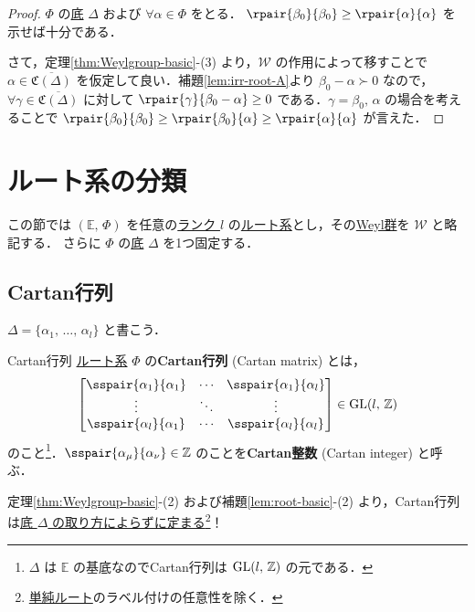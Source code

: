 \documentclass[rep_main]{subfiles}
\begin{document}
\begin{proof}
	$\Phi$ の\hyperref[def:base-root]{底} $\Delta$ および $\forall \alpha \in \Phi$ をとる．
	$\rpair{\beta_0}{\beta_0} \ge \rpair{\alpha}{\alpha}$ を示せば十分である．

	さて，定理\ref{thm:Weylgroup-basic}-(3) より，$\mathscr{W}$ の作用によって移すことで $\alpha \in \overline{\mathfrak{C}(\Delta)}$ を仮定して良い．補題\ref{lem:irr-root-A}より $\beta_0 -\alpha \succ 0$ なので，$\forall \gamma \in \overline{\mathfrak{C}(\Delta)}$ に対して $\rpair{\gamma}{\beta_0 - \alpha} \ge 0$ である．$\gamma = \beta_0,\, \alpha$ の場合を考えることで $\rpair{\beta_0}{\beta_0} \ge \rpair{\beta_0}{\alpha} \ge \rpair{\alpha}{\alpha}$ が言えた．
\end{proof}

\section{ルート系の分類}

この節では $(\mathbb{E},\, \Phi)$ を任意の\hyperref[def:rank-root]{ランク $l$} の\hyperref[ax:root-system]{ルート系}とし，その\hyperref[def:Weylgroup]{Weyl群}を $\mathscr{W}$ と略記する． 
さらに $\Phi$ の\hyperref[def:base-root]{底} $\Delta$ を1つ固定する．

\subsection{Cartan行列}

$\Delta = \{\alpha_1,\, \dots,\, \alpha_l\}$ と書こう．

\begin{mydef}[label=def:Cartan-matrix]{Cartan行列}
	\hyperref[ax:root-system]{ルート系} $\Phi$ の\textbf{Cartan行列} (Cartan matrix) とは，
	\begin{align}
		\mqty[\sspair{\alpha_1}{\alpha_1} &\cdots &\sspair{\alpha_1}{\alpha_l} \\ \vdots &\ddots &\vdots \\ \sspair{\alpha_l}{\alpha_1} &\cdots & \sspair{\alpha_l}{\alpha_l}] \in \LGL(l,\, \mathbb{Z})
	\end{align}
	のこと\footnote{$\Delta$ は $\mathbb{E}$ の基底なのでCartan行列は $\mathrm{GL}(l,\, \mathbb{Z})$ の元である．}．$\sspair{\alpha_\mu}{\alpha_\nu} \in \mathbb{Z}$ のことを\textbf{Cartan整数} (Cartan integer) と呼ぶ．
\end{mydef}

定理\ref{thm:Weylgroup-basic}-(2) および補題\ref{lem:root-basic}-(2) より，Cartan行列は\underline{底 $\Delta$ の取り方によらずに定まる}\footnote{\hyperref[def:base-root]{単純ルート}のラベル付けの任意性を除く．}！
\end{document}

